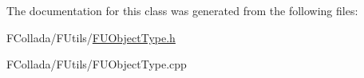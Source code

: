 The documentation for this class was generated from the following files:\begin{DoxyCompactItemize}
\item 
FCollada/FUtils/\hyperlink{FUObjectType_8h}{FUObjectType.h}\item 
FCollada/FUtils/FUObjectType.cpp\end{DoxyCompactItemize}

